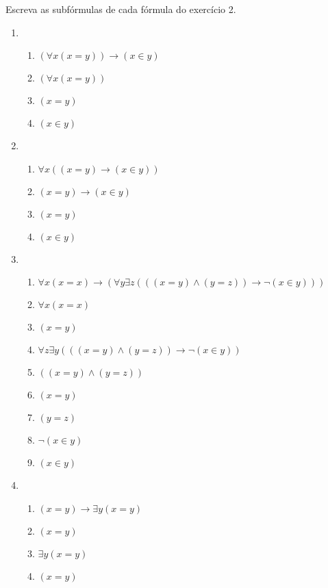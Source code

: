 \begin{exercicio}
	Escreva as subfórmulas de cada fórmula do exercício 2.
\end{exercicio}

\begin{solucao}

\begin{enumerate}
	\item 
	\begin{enumerate}
		\item $(\forall x (x = y)) \rightarrow (x \in y)$
		\item $(\forall x (x = y))$
		\item $(x = y)$
		\item $(x \in y)$
	\end{enumerate}
	
	\item 
	\begin{enumerate}
		\item $\forall x ((x = y) \rightarrow (x \in y))$
		\item $(x = y) \rightarrow (x \in y)$
		\item $(x = y)$
		\item $(x \in y)$
	\end{enumerate}
	
	\item 
	\begin{enumerate}
		\item $\forall x (x = x) \rightarrow (\forall y \exists z (((x = y) \land (y = z)) \rightarrow \neg (x \in y)))$
		\item $\forall x (x = x)$
		\item $(x = y)$
		\item $\forall z \exists y (((x = y) \land (y = z)) \rightarrow \neg (x \in y))$
		\item $((x = y) \land (y = z))$
		\item $(x = y)$
		\item $(y = z)$
		\item $\neg (x \in y)$
		\item $(x \in y)$
	\end{enumerate}
	
	\item 
	\begin{enumerate}
		\item $(x = y) \rightarrow \exists y (x = y)$
		\item $(x = y)$
		\item $\exists y (x = y)$
		\item $(x = y)$
	\end{enumerate}
\end{enumerate}

\end{solucao}